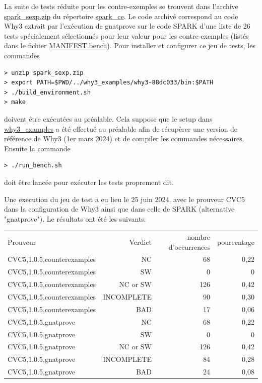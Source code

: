 \documentclass[a4paper,11pt]{article}
\begin{document}
La suite de tests réduite pour les contre-exemples se trouvent dans l'archive
\url{spark_sexp.zip} du répertoire \url{spark_ce}.  Le code archivé correspond
au code Why3 extrait par l'exécution de gnatprove sur le code SPARK d'une liste de
26 tests spécialement sélectionnés pour leur valeur pour les contre-exemples
(listés dans le fichier \url{MANIFEST.bench}). Pour installer et configurer ce
jeu de tests, les commandes
\begin{lstlisting}
> unzip spark_sexp.zip
> export PATH=$PWD/../why3_examples/why3-88dc033/bin:$PATH
> ./build_environment.sh
> make
\end{lstlisting}
doivent être exécutées au préalable. Cela suppose que le setup dans \url{why3_examples}
a été effectué au préalable afin de récupèrer une version de
référence de Why3 (1er mars 2024) et de compiler les commandes nécessaires. Ensuite la commande
\begin{lstlisting}
> ./run_bench.sh
\end{lstlisting}
doit être lancée pour exécuter les tests proprement dit.

Une execution du jeu de test a eu lieu le 25 juin 2024, avec le prouveur CVC5 dans
la configuration de Why3 ainsi que dans celle de SPARK (alternative "gnatprove").
Le résultats ont été les suivants:

\begin{center}
  \begin{tabular}{|l|r|r|r|}
    \hline
  \rowcolor{gray!50} Prouveur
  & \multicolumn{1}{p{0.4\textwidth}|}{Verdict}
  & \multicolumn{1}{p{0.13\textwidth}|}{nombre d'occurrences}
  & \multicolumn{1}{p{0.13\textwidth}|}{pourcentage} \\
CVC5,1.0.5,counterexamples & NC         & 68 & 0,22\\
CVC5,1.0.5,counterexamples & SW         & 0 & 0\\
CVC5,1.0.5,counterexamples & NC or SW   & 126& 0,42\\
CVC5,1.0.5,counterexamples & INCOMPLETE & 90 & 0,30\\
CVC5,1.0.5,counterexamples & BAD        & 17 & 0,06\\
    \hline
CVC5,1.0.5,gnatprove       & NC         & 68 & 0,22\\
CVC5,1.0.5,gnatprove       & SW         & 0 & 0\\
CVC5,1.0.5,gnatprove       & NC or SW   & 126& 0,42\\
CVC5,1.0.5,gnatprove       & INCOMPLETE & 84 & 0,28\\
CVC5,1.0.5,gnatprove       & BAD        & 24 & 0,08\\
    \hline
  \end{tabular}
\end{center}
\end{document}
